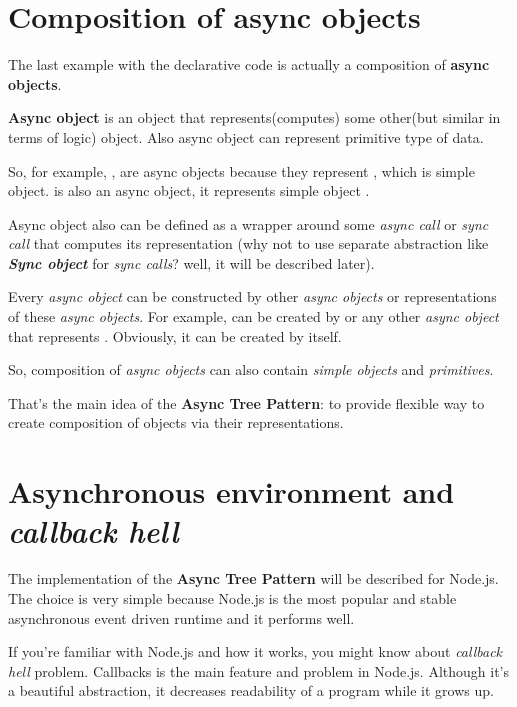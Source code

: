 \documentclass{article}
\newcommand{\cit}[1]{{\fontfamily{qcr}\selectfont{\textit{\textcolor{superdarkgray}{#1}}}}}
\newcommand{\bit}[1]{\textit{\textbf{#1}}}
\begin{document}
\section{Composition of async objects}

The last example with the declarative code is actually a composition of \textbf{async objects}.

\textbf{Async object} is an object that represents(computes) some other(but similar in terms of logic) object. Also async object can represent primitive type of data.

So, for example, \cit{SavedAccount}, \cit{CreatedAccount} are async objects because they represent \cit{Account}, which is simple object. \cit{UserFromDb} is also an async object, it represents simple object \cit{User}.

Async object also can be defined as a wrapper around some \textit{async call} or \textit{sync call} that computes its representation (why not to use separate abstraction like \bit{Sync object} for \textit{sync calls}? well, it will be described later).

Every \textit{async object} can be constructed by other \textit{async objects} or representations of these \textit{async objects}. For example, \cit{SavedAccount} can be created by \cit{CreatedAccount} or any other \textit{async object} that represents \cit{Account}. Obviously, it can be created by \cit{Account} itself.

So, composition of \textit{async objects} can also contain \textit{simple objects} and \textit{primitives}.

That's the main idea of the \textbf{Async Tree Pattern}: to provide flexible way to create composition of objects via their representations.

\section{Asynchronous environment and \textit{callback hell}}

The implementation of the \textbf{Async Tree Pattern} will be described for Node.js. The choice is very simple because Node.js is the most popular and stable asynchronous  event driven runtime and it performs well.

If you're familiar with Node.js and how it works, you might know about \textit{callback hell} problem. Callbacks is the main feature and problem in Node.js. Although it's a beautiful abstraction, it decreases readability of a program while it grows up.
\end{document}
